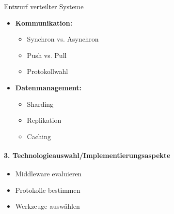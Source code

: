 \begin{KR}{Entwurf verteilter Systeme}
    \begin{minipage}[t]{0.5\textwidth}
        \begin{itemize}
            \item \textbf{Kommunikation:}
        \begin{itemize}
            \item Synchron vs. Asynchron
            \item Push vs. Pull
            \item Protokollwahl
        \end{itemize}
    \end{itemize}
    \end{minipage}
    \begin{minipage}[t]{0.5\textwidth}
        \begin{itemize}
            \item \textbf{Datenmanagement:}
        \begin{itemize}
            \item Sharding
            \item Replikation
            \item Caching
        \end{itemize}
    \end{itemize}
    \end{minipage}
    
\paragraph{3. Technologieauswahl/Implementierungsaspekte}
\begin{itemize}
    \item Middleware evaluieren
    \item Protokolle bestimmen
    \item Werkzeuge auswählen
\end{itemize}


\end{KR}
